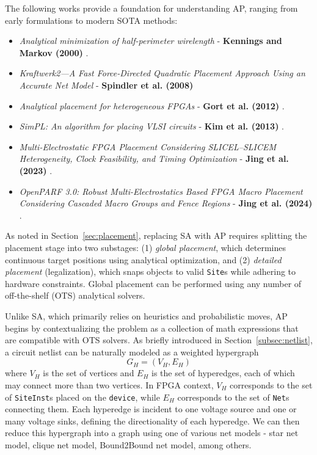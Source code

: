 The following works provide a foundation for understanding AP, ranging from early formulations to modern SOTA methods:
\begin{itemize}
    \item \emph{Analytical minimization of half-perimeter wirelength} - \textbf{Kennings and Markov (2000)} \cite{AP_2000}.
    \item \emph{Kraftwerk2—A Fast Force-Directed Quadratic Placement Approach Using an Accurate Net Model} - \textbf{Spindler et al. (2008)} \cite{kraftwerk2}
    \item \emph{Analytical placement for heterogeneous FPGAs} - \textbf{Gort et al. (2012)} \cite{AP_2012}.
    \item \emph{SimPL: An algorithm for placing VLSI circuits} - \textbf{Kim et al. (2013)} \cite{SimPL}.
    \item \emph{Multi-Electrostatic FPGA Placement Considering SLICEL–SLICEM Heterogeneity, Clock Feasibility, and Timing Optimization} - \textbf{Jing et al. (2023)} \cite{MultiElectrostatic}.
    \item \emph{OpenPARF 3.0: Robust Multi-Electrostatics Based FPGA Macro Placement Considering Cascaded Macro Groups and Fence Regions} - \textbf{Jing et al. (2024)} \cite{OpenPARF}.
\end{itemize}

As noted in Section~\ref{sec:placement}, replacing SA with AP requires splitting the placement stage into two substages:  
(1) \emph{global placement}, which determines continuous target positions using analytical optimization, and  
(2) \emph{detailed placement} (legalization), which snaps objects to valid \texttt{Site}s while adhering to hardware constraints.  
Global placement can be performed using any number of off-the-shelf (OTS) analytical solvers.

Unlike SA, which primarily relies on heuristics and probabilistic moves, AP begins by contextualizing the problem as a collection of math expressions that are compatible with OTS solvers.
As briefly introduced in Section~\ref{subsec:netlist}, a circuit netlist can be naturally modeled as a weighted hypergraph
\begin{equation}
    G_{H} = (V_{H}, E_{H})
    \label{equ:hypergraph}
\end{equation}
where \(V_{H}\) is the set of vertices and \(E_{H}\) is the set of hyperedges, each of which may connect more than two vertices. 
In FPGA context, \(V_{H}\) corresponds to the set of \texttt{SiteInst}s placed on the \texttt{device}, while \(E_{H}\) corresponds to the set of \texttt{Net}s connecting them.
Each hyperedge is incident to one voltage source and one or many voltage sinks, defining the directionality of each hyperedge.
We can then reduce this hypergraph into a graph using one of various net models - star net model, clique net model, Bound2Bound net model, among others.

